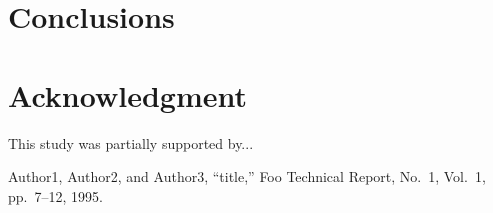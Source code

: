 \documentclass[10pt, conference, compsocconf]{IEEEtran}
\begin{document}
\begin{table}[tb]
  \begin{center}
    \caption{Baz table...}\label{tab:baz}
  \end{center}
\end{table}

\section{Conclusions}

\section*{Acknowledgment}
This study was partially supported by...

\begin{thebibliography}{10}
Author1, Author2, and Author3,
``title,''
Foo Technical Report, No.~1, Vol.~1, pp.~7--12, 1995.

\end{thebibliography}
\end{document}
